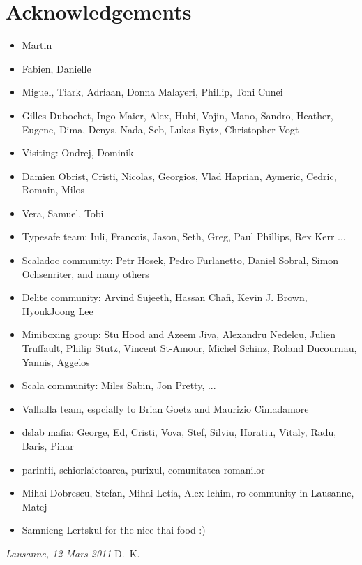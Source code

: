 \chapter*{Acknowledgements}

\begin{itemize}
  \item Martin
  \item Fabien, Danielle
  \item Miguel, Tiark, Adriaan, Donna Malayeri, Phillip, Toni Cunei
  \item Gilles Dubochet, Ingo Maier, Alex, Hubi, Vojin, Mano, Sandro, Heather, Eugene, Dima, Denys, Nada, Seb, Lukas Rytz, Christopher Vogt
  \item Visiting: Ondrej, Dominik
  \item Damien Obrist, Cristi, Nicolas, Georgios, Vlad Haprian, Aymeric, Cedric, Romain, Milos
  \item Vera, Samuel, Tobi
  \item Typesafe team: Iuli, Francois, Jason, Seth, Greg, Paul Phillips, Rex Kerr ...
  \item Scaladoc community: Petr Hosek, Pedro Furlanetto, Daniel Sobral, Simon Ochsenriter, and many others
  \item Delite community: Arvind Sujeeth, Hassan Chafi, Kevin J. Brown, HyoukJoong Lee
  \item Miniboxing group: Stu Hood and Azeem Jiva, Alexandru Nedelcu, Julien Truffault, Philip Stutz, Vincent St-Amour, Michel Schinz, Roland Ducournau, Yannis, Aggelos
  \item Scala community: Miles Sabin, Jon Pretty, ...
  \item Valhalla team, espcially to Brian Goetz and Maurizio Cimadamore
  \item dslab mafia: George, Ed, Cristi, Vova, Stef, Silviu, Horatiu, Vitaly, Radu, Baris, Pinar
  \item parintii, schiorlaietoarea, purixul, comunitatea romanilor
  \item Mihai Dobrescu, Stefan, Mihai Letia, Alex Ichim, ro community in Lausanne, Matej
  \item Samnieng Lertskul for the nice thai food :)
\end{itemize}

\bigskip

\noindent\textit{Lausanne, 12 Mars 2011}
\hfill D.~K.

